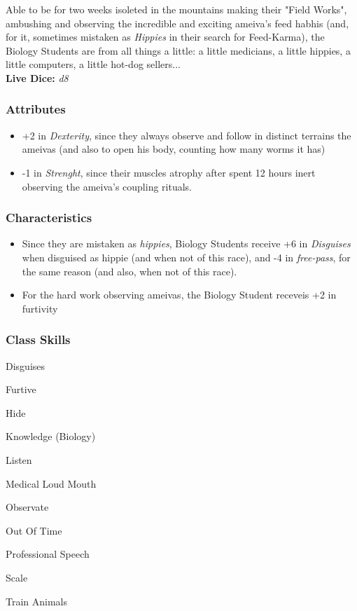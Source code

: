 \documentclass[ letterpaper,12pt]{article}
\begin{document}
Able to be for two weeks isoleted in the mountains making their "Field Works",
ambushing and observing the incredible and exciting ameiva's feed habhis (and,
for it, sometimes mistaken as {\it Hippies} in their search for Feed-Karma),
the Biology Students are from all things a little: a little medicians, a little
hippies, a little computers, a little hot-dog sellers...\\

{\bf Live Dice:} {\it d8}

\subsubsection{Attributes}
\begin{itemize}
\item{+2 in {\it Dexterity}, since they always observe and follow in distinct terrains the ameivas (and also to open his body, counting how many worms it has)}
\item{-1 in {\it Strenght}, since their muscles atrophy after spent 12 hours inert observing the ameiva's coupling rituals.}
\end{itemize}

\subsubsection{Characteristics}
\begin{itemize}
\item{Since they are mistaken as {\it hippies}, Biology Students receive +6 in {\it Disguises} when disguised as hippie (and when not of this race), and -4 in {\it free-pass}, for the same reason (and also, when not of this race).}
\item{For the hard work observing ameivas, the Biology Student receveis +2 in {furtivity}}
\end{itemize}

\subsubsection{Class Skills}
\begin{itemize}
{\it 
\item{Disguises}
\item{Furtive}
\item{Hide}
\item{Knowledge (Biology)}
\item{Listen}
\item{Medical Loud Mouth}
\item{Observate}
\item{Out Of Time}
\item{Professional Speech}
\item{Scale}
\item{Train Animals}
}
\end{itemize}
\end{document}
